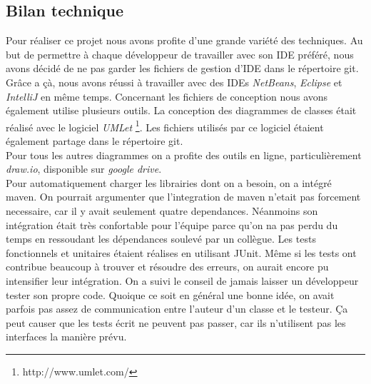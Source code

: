 \documentclass[10pt,a4paper]{book}
\begin{document}
\subsection{Bilan technique}
Pour réaliser ce projet nous avons profite d'une grande variété des techniques. Au but de permettre à chaque développeur de travailler avec son IDE préféré, nous avons décidé de ne pas garder les fichiers de gestion d'IDE dans le répertoire git. Grâce a çà, nous avons réussi à travailler avec des IDEs \textit{NetBeans}, \textit{Eclipse} et \textit{IntelliJ} en même temps. Concernant les fichiers de conception nous avons également utilise plusieurs outils. La conception des diagrammes de classes était réalisé avec le logiciel \textit{UMLet} \footnote{http://www.umlet.com/}. Les fichiers utilisés par ce logiciel étaient également partage dans le répertoire git.\\Pour tous les autres diagrammes on a profite des outils en ligne, particulièrement \textit{draw.io}, disponible sur \textit{google drive}.\\Pour automatiquement charger les librairies dont on a besoin, on a intégré maven. On pourrait argumenter que l'integration de maven n'etait pas forcement necessaire, car il y avait seulement quatre dependances. Néanmoins son intégration était très confortable pour l'équipe parce qu'on na pas perdu du temps en ressoudant les dépendances soulevé par un collègue.
Les tests fonctionnels et unitaires étaient réalises en utilisant JUnit. Même si les tests ont contribue beaucoup à trouver et résoudre des erreurs, on aurait encore pu intensifier leur intégration. On a suivi le conseil de jamais laisser un développeur tester son propre code. Quoique ce soit en général une bonne idée, on avait parfois pas assez de communication entre l'auteur d'un classe et le testeur. Ça peut causer que les tests écrit ne peuvent pas passer, car ils n'utilisent pas les interfaces la manière prévu.
\appendix{}
\end{document}
